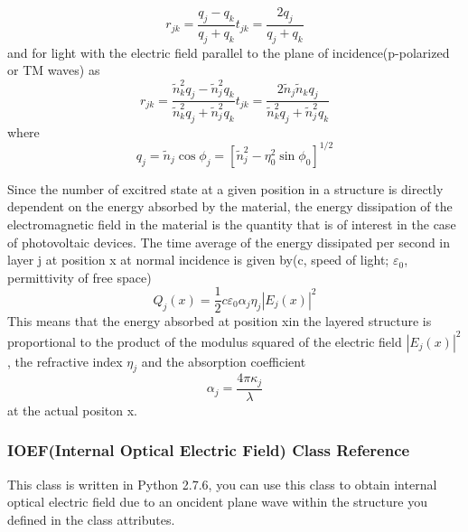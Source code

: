 \documentclass{article}
\begin{document}
\begin{subequations}
\begin{equation}
{{r}_{jk}}=\frac{{{q}_{j}}-{{q}_{k}}}{{{q}_{j}}+{{q}_{k}}}
\end{equation}
\begin{equation}
{{t}_{jk}}=\frac{2{{q}_{j}}}{{{q}_{j}}+{{q}_{k}}}
\end{equation}
\end{subequations}
and for light with the electric field parallel to the plane of
incidence(p-polarized or TM waves) as
\begin{subequations}
\begin{equation}
{{r}_{jk}}=\frac{\tilde{n}_{k}^{2}{{q}_{j}}-\tilde{n}_{j}^{2}{{q}_{k}}}{\tilde{n}_{k}^{2}{{q}_{j}}+\tilde{n}_{j}^{2}{{q}_{k}}}
\end{equation}
\begin{equation}
{{t}_{jk}}=\frac{2{{{\tilde{n}}}_{j}}{{{\tilde{n}}}_{k}}{{q}_{j}}}{\tilde{n}_{k}^{2}{{q}_{j}}+\tilde{n}_{j}^{2}{{q}_{k}}}
\end{equation}
\end{subequations}
where
\begin{equation}
{{q}_{j}}={{\tilde{n}}_{j}}\cos {{\phi }_{j}}={{[\tilde{n}_{j}^{2}-\eta
_{0}^{2}\sin {{\phi }_{0}}]}^{1/2}}
\end{equation}

Since the number of excitred state at a given position in a structure is
directly dependent on the energy absorbed by the material, the energy
dissipation of the electromagnetic field in the material is the quantity that is
of interest in the case of photovoltaic devices. The time average of the energy
dissipated per second in layer j at position x at normal incidence is given
by(c, speed of light; ${{\varepsilon }_{0}}$, permittivity of free space)
\begin{equation}
{{Q}_{j}}(x)=\frac{1}{2}c{{\varepsilon }_{0}}{{\alpha }_{j}}{{\eta
}_{j}}{{\left| {{E}_{j}}(x) \right|}^{2}}
\end{equation}
This means that the energy absorbed at position xin the layered structure is
proportional to the product of the modulus squared of the electric field
${{\left| {{E}_{j}}(x) \right|}^{2}}$, the refractive index ${{\eta }_{j}}$ and
the absorption coefficient
\begin{equation}
{{\alpha }_{j}}=\frac{4\pi {{\kappa }_{j}}}{\lambda }
\end{equation}
at the actual positon x.


\subsubsection{IOEF(Internal Optical Electric Field) Class Reference}
This class is written in Python 2.7.6, you can use this class to obtain internal
optical electric field due to an oncident plane wave
within the structure you defined in the class attributes.
\end{document}
